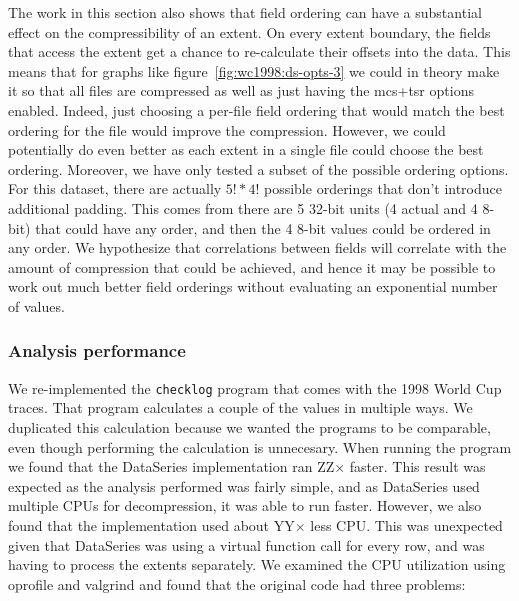 The work in this section also shows that field ordering can have a
substantial effect on the compressibility of an extent.  On every
extent boundary, the fields that access the extent get a chance to
re-calculate their offsets into the data.  This means that for graphs
like figure~\ref{fig:wc1998:ds-opts-3} we could in theory make it so
that all files are compressed as well as just having the mcs+tsr
options enabled.  Indeed, just choosing a per-file field ordering that
would match the best ordering for the file would improve the
compression.  However, we could potentially do even better as each
extent in a single file could choose the best ordering.  Moreover, we
have only tested a subset of the possible ordering options.  For this
dataset, there are actually $5!*4!$ possible orderings that don't
introduce additional padding.  This comes from there are 5 32-bit
units (4 actual and 4 8-bit) that could have any order, and then the 4
8-bit values could be ordered in any order.  We hypothesize that
correlations between fields will correlate with the amount of
compression that could be achieved, and hence it may be possible to
work out much better field orderings without evaluating an exponential
number of values.

\subsubsection{Analysis performance}

We re-implemented the {\tt checklog} program that comes with the 1998
World Cup traces.  That program calculates a couple of the values in
multiple ways.  We duplicated this calculation because we wanted the
programs to be comparable, even though performing the calculation is
unnecesary. When running the program we found that the DataSeries
implementation ran ZZ$\times$ faster.  This result was expected as the
analysis performed was fairly simple, and as DataSeries used multiple
CPUs for decompression, it was able to run faster.  However, we also
found that the implementation used about YY$\times$ less CPU.  This
was unexpected given that DataSeries was using a virtual function call
for every row, and was having to process the extents separately.  We
examined the CPU utilization using oprofile and valgrind and found
that the original code had three problems:


